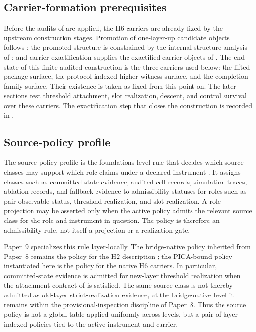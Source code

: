 \documentclass[11pt]{article}
\newcommand{\OldLayer}{H2}
\newcommand{\NewLayer}{H6}
\newcommand{\PaperNine}{Paper~9}
\newcommand{\PaperEight}{Paper~8}
\theoremstyle{definition}
\begin{document}
\subsection{Carrier-formation prerequisites}\label{subsec:pica-readiness}

Before the audits of  are
applied, the \NewLayer{} carriers are already fixed by the upstream construction
stages.  Promotion of one-layer-up candidate objects follows
\cite{Tsiokos2026PromotionCriteria}; the promoted structure is constrained by
the internal-structure analysis of \cite{Tsiokos2026InternalStructure}; and
carrier exactification supplies the exactified carrier objects of
\cite{Tsiokos2026CarrierExactification}.  The end state of this finite audited
construction is the three carriers used below: the lifted-package surface, the
protocol-indexed higher-witness surface, and the completion-family surface.
Their existence is taken as fixed from this point on.  The later sections test
threshold attachment, slot realization, descent, and control survival over
these carriers.  The exactification step that closes the construction is
recorded in .

\subsection{Source-policy profile}\label{subsec:pica-source-policy-profile}

The source-policy profile is the foundations-level rule that decides which
source classes may support which role claims under a declared instrument
\cite{Tsiokos2026Foundations,Tsiokos2026FoundationsII}.  It assigns classes
such as committed-state evidence, audited cell records, simulation traces,
ablation records, and fallback evidence to admissibility statuses for roles
such as pair-observable status, threshold realization, and slot realization.
A role projection may be asserted only when the active policy admits the
relevant source class for the role and instrument in question.  The policy is
therefore an admissibility rule, not itself a projection or a realization gate.

\PaperNine{} specializes this rule layer-locally.  The bridge-native policy
inherited from \PaperEight{} remains the policy for the \OldLayer{} description
\cite{Tsiokos2026CarrierToEvent}; the PICA-bound policy instantiated here is
the policy for the native \NewLayer{} carriers.  In particular,
committed-state evidence is admitted for new-layer threshold realization when
the attachment contract of
 is satisfied.  The same source
class is not thereby admitted as old-layer strict-realization evidence; at the
bridge-native level it remains within the provisional-inspection discipline of
\PaperEight{}.  Thus the source policy is not a global table applied uniformly
across levels, but a pair of layer-indexed policies tied to the active
instrument and carrier.
\end{document}
